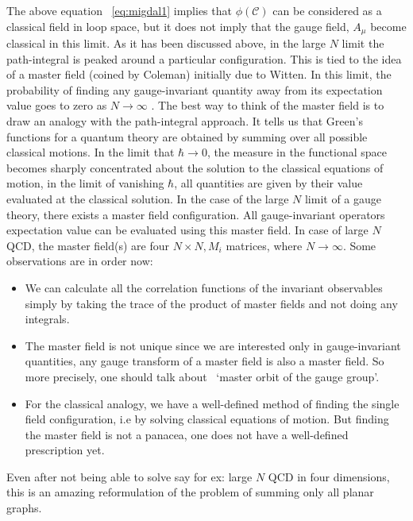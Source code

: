The above equation ~\ref{eq:migdal1} implies that $ \phi(\mathcal{C})$ can be considered as a classical field in loop space, 
but it does not imply that the gauge field, $A_{\mu}$ become classical in this limit. 
As it has been discussed above, in the large $N$ limit the path-integral is peaked around a particular configuration. 
This is tied to the idea of a master field (coined by Coleman) initially due to Witten. In this limit, the probability of finding 
any gauge-invariant 
quantity away from its expectation value goes to zero as $N \to \infty$ \cite{Gopakumar:1994iq}.
The best way to think of the master field is to draw an analogy with the path-integral approach. 
It tells us that Green's functions for a quantum theory are obtained by summing over all possible classical motions. 
In the limit that $\hbar \to 0$, the measure in the functional space becomes sharply concentrated about the solution to
 the classical equations of motion, in the limit of vanishing $\hbar$, 
all quantities are given by their value evaluated at the classical solution. 
In the case of the large $N$ limit of a gauge theory, there exists a master field configuration. 
All gauge-invariant operators expectation value can be evaluated using this master field. 
In case of large $N$ QCD, the master field(s) are four $N \times N , M_{i}$ matrices, where $N \to \infty$.  
Some observations are in order now: 

\begin{itemize}
\item We can calculate all the correlation functions of the invariant observables simply by taking the trace of the product of master fields and not doing any integrals. 
\item The master field is not unique since we are interested only in gauge-invariant quantities, any gauge transform of a master field is also a master field. 
So more precisely, one should talk about ~`master orbit of the gauge group'. 
\item For the classical analogy, we have a well-defined method of finding the single field configuration, i.e by solving classical equations of motion. 
But finding the master field is not a panacea, one does not have a well-defined prescription yet.
\end{itemize} 
Even after not being able to solve say for ex: large $N$ QCD in four dimensions, this is an amazing reformulation of the problem of summing only all planar graphs. 






